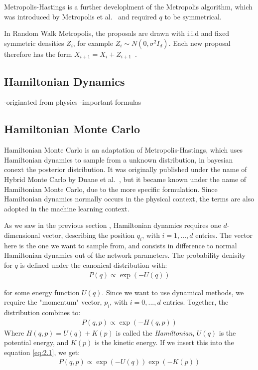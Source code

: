 Metropolis-Hastings is a further developlment of the Metropolis algorithm, which was introduced by Metropolis et al.~\cite{metropolis1953} and required $q$ to be symmetrical.

In Random Walk Metropolis, the proposals are drawn with i.i.d and fixed symmetric densities $Z_i$,
for example $Z_i\sim N(0,\sigma^2 I_d)$.
Each new proposal therefore has the form $X_{i+1} = X_i + Z_{i+1}$~\cite{rosenthal2011optimal}.
\subsection{Hamiltonian Dynamics}
-originated from physics
-important formulas
\subsection{Hamiltonian Monte Carlo}
Hamiltonian Monte Carlo is an adaptation of Metropolis-Hastings, which uses 
Hamiltonian dynamics to sample from a unknown distribution, in bayesian conext the posterior distribution.
It was originally published under the name of Hybrid Monte Carlo by Duane et al.~\cite{DUANE1987216}, but 
it became known under the name of Hamiltonian Monte Carlo, due to the more specific formulation.
Since Hamiltonian dynamics normally occurs in the physical context, the terms are also adopted in the machine learning context. 

As we saw in the previous section , Hamiltonian dynamics requires one $d$-dimensional vector, describing the position $q_i$, with $i=1,...,d$ entries. 
The vector here is the one we want to sample from, and consists in difference to normal Hamiltonian dynamics out of the network parameters. 
The probability denisity for $q$ is defined under the canonical distribution with:
\begin{align}
P(q)\propto \exp(-U(q))\label{eq:2.1}
\end{align}


for some energy function $U(q)$.
Since we want to use dynamical methods, we require
the "momentum" vector, $p_i$, with $i=0,...,d$ entries. 
Together, the distribution combines to:
\begin{align}
P(q,p)\propto \exp(-H(q,p))\label{eq:2.2}
\end{align}
Where $H(q,p) = U(q)+K(p)$ is called the \textit{Hamiltonian}, 
$U(q)$ is the potential energy, and $K(p)$ is the kinetic energy. 
If we insert this into the equation \ref{eq:2.1}, we get:
\begin{align}
    P(q,p)\propto\exp(-U(q))\exp(-K(p))\label{eq:2.3}
\end{align}

